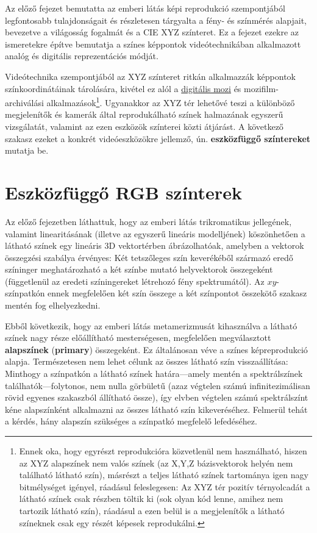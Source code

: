 Az előző fejezet bemutatta az emberi látás képi reprodukció szempontjából legfontosabb tulajdonságait és részletesen tárgyalta a fény- és színmérés alapjait, bevezetve a világosság fogalmát és a CIE XYZ színteret.
Ez a fejezet ezekre az ismeretekre építve bemutatja a színes képpontok videótechnikában alkalmazott analóg és digitális reprezentációs módját.

\vspace{3mm}
Videótechnika szempontjából az XYZ színteret ritkán alkalmazzák képpontok színkoordinátáinak tárolására, kivétel ez alól a \href{https://en.wikipedia.org/wiki/Digital_Cinema_Package}{digitális mozi} és mozifilm-archiválási alkalmazások\footnote{Ennek oka, hogy egyrészt reprodukcióra közvetlenül nem használható, hiszen az XYZ alapszínek nem valós színek (az X,Y,Z bázisvektorok helyén nem található látható szín), másrészt a teljes látható színek tartománya igen nagy bitmélységet igényel, ráadásul feleslegesen:
Az XYZ tér pozitív térnyolcadát a látható színek csak részben töltik ki (sok olyan kód lenne, amihez nem tartozik látható szín), ráadásul a ezen belül is a megjelenítők a látható színeknek csak egy részét képesek reprodukálni.}.
Ugyanakkor az XYZ tér lehetővé teszi a különböző megjelenítők és kamerák által reprodukálható színek halmazának egyszerű vizsgálatát, valamint az ezen eszközök színterei közti átjárást.
A következő szakasz ezeket a konkrét videóeszközökre jellemző, ún. \textbf{eszközfüggő színtereket} mutatja be.

\section{Eszközfüggő RGB színterek}

Az előző fejezetben láthattuk, hogy az emberi látás trikromatikus jellegének, valamint linearitásának (illetve az egyszerű lineáris modelljének) köszönhetően a látható színek egy lineáris 3D vektortérben ábrázolhatóak, amelyben a vektorok összegzési szabálya érvényes: 
Két tetszőleges szín keverékéből származó eredő színinger meghatározható a két színbe mutató helyvektorok összegeként (függetlenül az eredeti színingereket létrehozó fény spektrumától).
Az $xy$-színpatkón ennek megfelelően két szín összege a két színpontot összekötő szakasz mentén fog elhelyezkedni.

Ebből következik, hogy az emberi látás metamerizmusát kihasználva a látható színek nagy része előállítható mesterségesen, megfelelően megválasztott \textbf{alapszínek} (\textbf{primary}) összegeként.
Ez általánosan véve a színes képreprodukció alapja.
Természetesen nem lehet célunk az összes látható szín visszaállítása: 
Minthogy a színpatkón a látható színek határa---amely mentén a spektrálszínek találhatók---folytonos, nem nulla görbületű (azaz végtelen számú infinitezimálisan rövid egyenes szakaszból állítható össze), így elvben végtelen számú spektrálszínt kéne alapszínként alkalmazni az összes látható szín kikeveréséhez.
Felmerül tehát a kérdés, hány alapszín szükséges a színpatkó megfelelő lefedéséhez.

